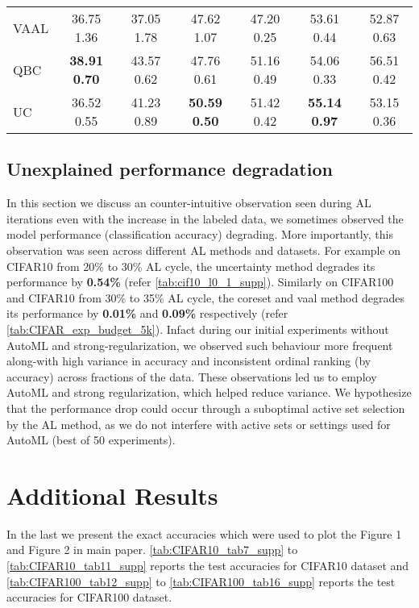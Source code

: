 \documentclass[10pt,twocolumn,letterpaper]{article}
\begin{document}
\begin{table*}[ht]
{\begin{tabular}{l|cccccc}
VAAL &  36.75  1.36 & 37.05  1.78 & 47.62  1.07 & 47.20  0.25 & 53.61  0.44 & 52.87  0.63\\

QBC &  \textbf{38.91}  \textbf{0.70} & 43.57  0.62 & 47.76  0.61 & 51.16  0.49 & 54.06  0.33 & 56.51  0.42\\

UC &  36.52  0.55 & 41.23  0.89 & \textbf{50.59}  \textbf{0.50} & 51.42  0.42 & \textbf{55.14}  \textbf{0.97} & 53.15  0.36\\
\bottomrule
\end{tabular}}
\caption{Mean Accuracy and Standard Deviation on CIFAR10/100 test set with annotation size as  of training set. Results reported are averaged over 5 runs where hyper-parameters are tuned in the first run using AutoML random search over 50 trials.}
\label{tab:CIFAR_exp_budget_5k}
\end{table*}


\subsection{Unexplained performance degradation}

In this section we discuss an counter-intuitive observation seen during AL iterations \ie even with the increase in the labeled data, we sometimes observed the model performance (classification accuracy) degrading. More importantly, this observation was seen across different AL methods and datasets. For example on CIFAR10 from 20\% to 30\% AL cycle, the uncertainty method degrades its performance by \textbf{0.54\%} (refer \cref{tab:cif10_l0_1_supp}). Similarly on CIFAR100 and CIFAR10 from 30\% to 35\% AL cycle, the coreset and vaal method degrades its performance by \textbf{0.01\%} and \textbf{0.09\%} respectively (refer \cref{tab:CIFAR_exp_budget_5k}). Infact during our initial experiments without AutoML and strong-regularization, we observed such behaviour more frequent along-with high variance in accuracy and inconsistent ordinal ranking (by accuracy) across fractions of the data. These observations led us to employ AutoML and  strong regularization, which helped reduce variance. We hypothesize that the performance drop could occur through a suboptimal active set selection by the AL method, as we do not interfere with active sets or settings used for AutoML (best of 50 experiments).

\section{Additional Results}
In the last we present the exact accuracies which were used to plot the Figure 1 and Figure 2 in main paper. \cref{tab:CIFAR10_tab7_supp} to \cref{tab:CIFAR10_tab11_supp} reports the test accuracies for CIFAR10 dataset and \cref{tab:CIFAR100_tab12_supp} to \cref{tab:CIFAR100_tab16_supp} reports the test accuracies for CIFAR100 dataset.  
\end{document}
